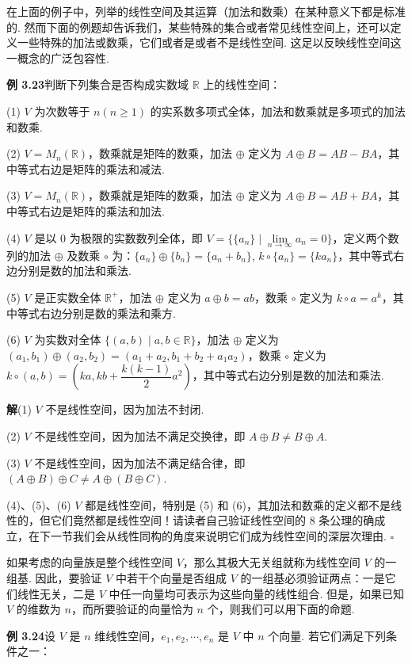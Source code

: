 \documentclass[UTF8, 12pt, fontset=fandol, oneside]{ctexart}
\begin{document}
在上面的例子中，列举的线性空间及其运算（加法和数乘）在某种意义下都是标准的. 然而下面的例题却告诉我们，某些特殊的集合或者常见线性空间上，还可以定义一些特殊的加法或数乘，它们或者是或者不是线性空间. 这足以反映线性空间这一概念的广泛包容性.

\noindent\textbf{例 3.23}\quad 判断下列集合是否构成实数域 $\mathbb{R}$ 上的线性空间：

(1) $V$ 为次数等于 $n(n\ge 1)$ 的实系数多项式全体，加法和数乘就是多项式的加法和数乘.

(2) $V=M_n(\mathbb{R})$，数乘就是矩阵的数乘，加法 $\oplus$ 定义为 $A\oplus B=AB-BA$，其中等式右边是矩阵的乘法和减法.

(3) $V=M_n(\mathbb{R})$，数乘就是矩阵的数乘，加法 $\oplus$ 定义为 $A\oplus B=AB+BA$，其中等式右边是矩阵的乘法和加法.

(4) $V$ 是以 0 为极限的实数数列全体，即 $V=\{\{a_n\}\mid \lim\limits_{n\to\infty}a_n=0\}$，定义两个数列的加法 $\oplus$ 及数乘 $\circ$ 为：$\{a_n\}\oplus\{b_n\}=\{a_n+b_n\}$, $k\circ\{a_n\}=\{ka_n\}$，其中等式右边分别是数的加法和乘法.

(5) $V$ 是正实数全体 $\mathbb{R}^+$，加法 $\oplus$ 定义为 $a\oplus b=ab$，数乘 $\circ$ 定义为 $k\circ a=a^k$，其中等式右边分别是数的乘法和乘方.

(6) $V$ 为实数对全体 $\{(a,b)\mid a,b\in\mathbb{R}\}$，加法 $\oplus$ 定义为 $(a_1,b_1)\oplus(a_2,b_2)=(a_1+a_2,b_1+b_2+a_1a_2)$，数乘 $\circ$ 定义为 $k\circ(a,b)=\left(ka,kb+\dfrac{k(k-1)}{2}a^2\right)$，其中等式右边分别是数的加法和乘法.

\noindent\textbf{解}\quad (1) $V$ 不是线性空间，因为加法不封闭.

(2) $V$ 不是线性空间，因为加法不满足交换律，即 $A\oplus B\ne B\oplus A$.

(3) $V$ 不是线性空间，因为加法不满足结合律，即 $(A\oplus B)\oplus C\ne A\oplus(B\oplus C)$.

(4)、(5)、(6) $V$ 都是线性空间，特别是 (5) 和 (6)，其加法和数乘的定义都不是线性的，但它们竟然都是线性空间！请读者自己验证线性空间的 8 条公理的确成立，在下一节我们会从线性同构的角度来说明它们成为线性空间的深层次理由. $\square$

如果考虑的向量族是整个线性空间 $V$，那么其极大无关组就称为线性空间 $V$ 的一组基. 因此，要验证 $V$ 中若干个向量是否组成 $V$ 的一组基必须验证两点：一是它们线性无关，二是 $V$ 中任一向量均可表示为这些向量的线性组合. 但是，如果已知 $V$ 的维数为 $n$，而所要验证的向量恰为 $n$ 个，则我们可以用下面的命题.

\noindent\textbf{例 3.24}\quad 设 $V$ 是 $n$ 维线性空间，$e_1,e_2,\cdots,e_n$ 是 $V$ 中 $n$ 个向量. 若它们满足下列条件之一：
\end{document}
